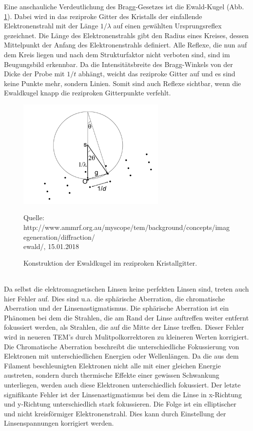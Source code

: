 \documentclass[a4paper,11pt,DIV=11]{scrartcl}
\begin{document}
Eine anschauliche Verdeutlichung des Bragg-Gesetzes ist die Ewald-Kugel (Abb. \ref{ewald}). Dabei wird in das reziproke Gitter des Kristalls der einfallende Elektronenstrahl mit der Länge \(1/\lambda\) auf einen gewählten Ursprungsreflex gezeichnet. Die Länge des Elektronenstrahls gibt den Radius eines Kreises, dessen Mittelpunkt der Anfang des Elektronenstrahls definiert. Alle Reflexe, die nun auf dem Kreis liegen und nach dem Strukturfaktor nicht verboten sind, sind im Beugungsbild erkennbar. Da die Intensitätsbreite des Bragg-Winkels von der Dicke der Probe mit \(1/t\) abhängt, weicht das reziproke Gitter auf und es sind keine Punkte mehr, sondern Linien. Somit sind auch Reflexe sichtbar, wenn die Ewaldkugel knapp die reziproken Gitterpunkte verfehlt.
\begin{figure}\center
\includegraphics[width=0.65\textwidth]{ewald.png}
\caption{Konstruktion der Ewaldkugel im reziproken Kristallgitter.}
\begin{flushleft}
{\footnotesize Quelle: http://www.ammrf.org.au/myscope/tem/background/concepts/imagegeneration/diffraction/\\ewald/, 15.01.2018}
\end{flushleft}
\label{ewald}
\end{figure}
\\
Da selbst die elektromagnetischen Linsen keine perfekten Linsen sind, treten auch hier Fehler auf. Dies sind u.a. die sphärische Aberration, die chromatische Aberration und der Linsenastigmatismus. Die sphärische Aberration ist ein Phänomen bei dem die Strahlen, die am Rand der Linse auftreffen weiter entfernt fokussiert werden, als Strahlen, die auf die Mitte der Linse treffen. Dieser Fehler wird in neueren TEM's durch Mulitpolkorrektoren zu kleineren Werten korrigiert. Die Chromatische Aberration beschreibt die unterschiedliche Fokussierung von Elektronen mit unterschiedlichen Energien oder Wellenlängen. Da die aus dem Filament beschleunigten Elektronen nicht alle mit einer gleichen Energie austreten, sondern durch thermische Effekte einer gewissen Schwankung unterliegen, werden auch diese Elektronen unterschiedlich fokussiert. Der letzte signifikante Fehler ist der Linsenastigmatismus bei dem die Linse in x-Richtung und y-Richtung unterschiedlich stark fokussieren. Die Folge ist ein elliptischer und nicht kreisförmiger Elektronenstrahl. Dies kann durch Einstellung der Linsenspannungen korrigiert werden.
	
\end{document}
